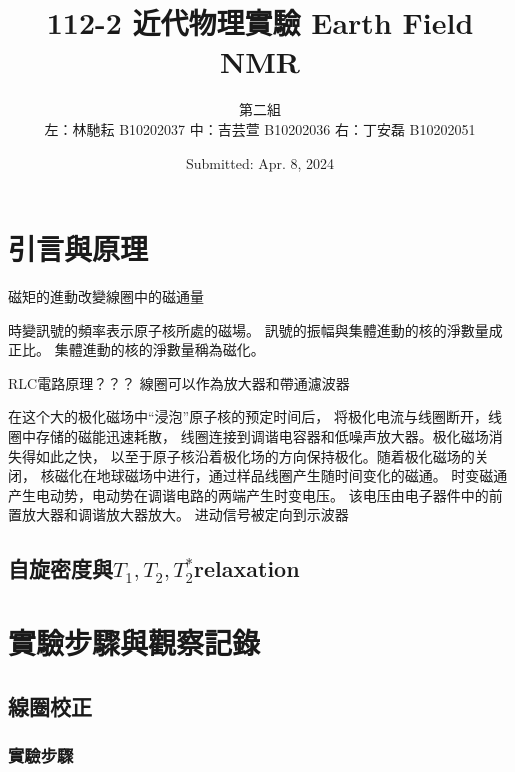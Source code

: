\documentclass[twocolumn]{article}
\title{112-2 近代物理實驗 Earth Field NMR\\\vspace{1cm}}
\author{第二組 \\ 左：林馳耘 B10202037 中：吉芸萱 B10202036 右：丁安磊 B10202051}
\date{Submitted: Apr. 8, 2024}
\begin{document}
\newcommand{\momega}{~{\rm m}\Omega}
\renewcommand{\figurename}{圖}
\renewcommand{\tablename}{表}
\newcommand{\br}[1]{\left(#1\right)}
\renewcommand{\vb}[1]{\boldsymbol{\mathbf{#1}}} %
\newcommand\inlineeqno{\refstepcounter{equation}~~ \hspace*{\fill} \mbox{(\theequation)}}

\maketitle

\section{引言與原理}

磁矩的進動改變線圈中的磁通量

時變訊號的頻率表示原子核所處的磁場。
訊號的振幅與集體進動的核的淨數量成正比。
集體進動的核的淨數量稱為磁化。

RLC電路原理？？？
  線圈可以作為放大器和帶通濾波器

  在这个大的极化磁场中“浸泡”原子核的预定时间后，
  将极化电流与线圈断开，线圈中存储的磁能迅速耗散，
  线圈连接到调谐电容器和低噪声放大器。极化磁场消失得如此之快，
  以至于原子核沿着极化场的方向保持极化。随着极化磁场的关闭，
  核磁化在地球磁场中进行，通过样品线圈产生随时间变化的磁通。
  时变磁通产生电动势，电动势在调谐电路的两端产生时变电压。
  该电压由电子器件中的前置放大器和调谐放大器放大。
  进动信号被定向到示波器

\subsection{自旋密度與$T_1, T_2, T_2^*$relaxation}





\section{實驗步驟與觀察記錄}

\subsection{線圈校正}
\subsubsection*{實驗步驟}
\end{document}
